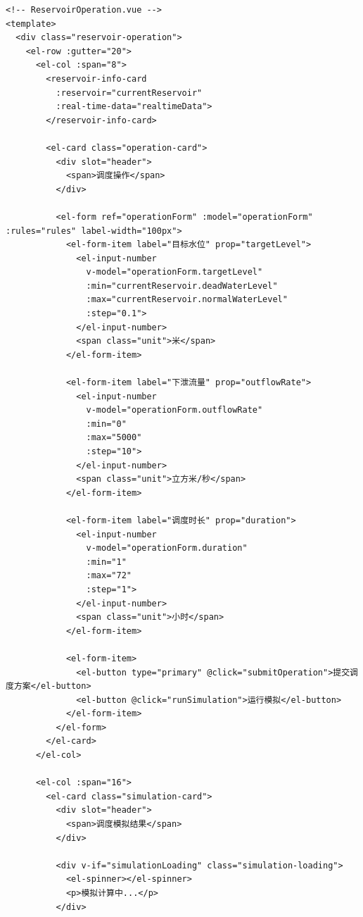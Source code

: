 \begin{lstlisting}
<!-- ReservoirOperation.vue -->
<template>
  <div class="reservoir-operation">
    <el-row :gutter="20">
      <el-col :span="8">
        <reservoir-info-card 
          :reservoir="currentReservoir"
          :real-time-data="realtimeData">
        </reservoir-info-card>
        
        <el-card class="operation-card">
          <div slot="header">
            <span>调度操作</span>
          </div>
          
          <el-form ref="operationForm" :model="operationForm" :rules="rules" label-width="100px">
            <el-form-item label="目标水位" prop="targetLevel">
              <el-input-number 
                v-model="operationForm.targetLevel" 
                :min="currentReservoir.deadWaterLevel" 
                :max="currentReservoir.normalWaterLevel"
                :step="0.1">
              </el-input-number>
              <span class="unit">米</span>
            </el-form-item>
            
            <el-form-item label="下泄流量" prop="outflowRate">
              <el-input-number 
                v-model="operationForm.outflowRate" 
                :min="0" 
                :max="5000"
                :step="10">
              </el-input-number>
              <span class="unit">立方米/秒</span>
            </el-form-item>
            
            <el-form-item label="调度时长" prop="duration">
              <el-input-number 
                v-model="operationForm.duration" 
                :min="1" 
                :max="72"
                :step="1">
              </el-input-number>
              <span class="unit">小时</span>
            </el-form-item>
            
            <el-form-item>
              <el-button type="primary" @click="submitOperation">提交调度方案</el-button>
              <el-button @click="runSimulation">运行模拟</el-button>
            </el-form-item>
          </el-form>
        </el-card>
      </el-col>
      
      <el-col :span="16">
        <el-card class="simulation-card">
          <div slot="header">
            <span>调度模拟结果</span>
          </div>
          
          <div v-if="simulationLoading" class="simulation-loading">
            <el-spinner></el-spinner>
            <p>模拟计算中...</p>
          </div>
          

\end{lstlisting}
